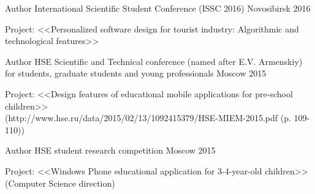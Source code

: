 \begin{cventries}

\cventry
{Author} %
{International Scientific Student Conference (ISSC 2016)} %
{Novosibirsk} %
{2016} %
{ %
\begin{cvitems}
\item {Project: <<Personalized software design for tourist industry: Algorithmic and technological features>>}
\end{cvitems}
}


\cventry
{Author} %
{HSE Scientific and Technical conference (named after E.V. Armenskiy) for students, graduate students and young professionals} %
{Moscow} %
{2015} %
{ %
\begin{cvitems}
\item {Project: <<Design features of educational mobile applications for pre-school children>>
	\\ (http://www.hse.ru/data/2015/02/13/1092415379/HSE-MIEM-2015.pdf (p. 109-110))}
\end{cvitems}
}

\cventry
{Author} %
{HSE student research competition} %
{Moscow} %
{2015} %
{ %
\begin{cvitems}
\item {Project: <<Windows Phone educational application for 3-4-year-old children>> (Computer Science direction)}
\end{cvitems}
}

\end{cventries}